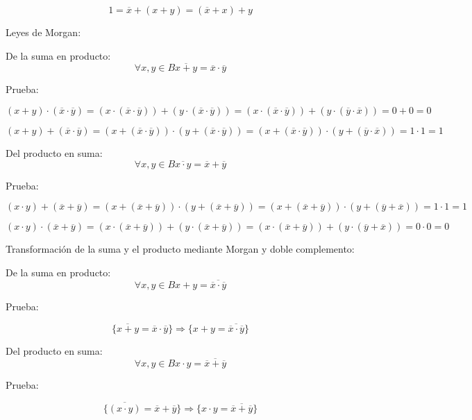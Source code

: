 \[{1 = {\overline{x} + {({x + y})}}} = {{({\overline{x} + x})} + y}\]

Leyes de Morgan:

De la suma en
producto:\[\forall x,{y \in B}{\overline{x+y} = {\overline{x} \cdot \overline{y}}}\]

Prueba:

\[{{{{{({x + y})} \cdot {({\overline{x} \cdot \overline{y}})}} = {{({x \cdot {({\overline{x} \cdot \overline{y}})}})} + {({y \cdot {({\overline{x} \cdot \overline{y}})}})}}} = {{({x \cdot {({\overline{x} \cdot \overline{y}})}})} + {({y \cdot {({\overline{y} \cdot \overline{x}})}})}}} = {0 + 0}} = 0\]

\[{{{{{({x + y})} + {({\overline{x} \cdot \overline{y}})}} = {{({x + {({\overline{x} \cdot \overline{y}})}})} \cdot {({y + {({\overline{x} \cdot \overline{y}})}})}}} = {{({x + {({\overline{x} \cdot \overline{y}})}})} \cdot {({y + {({\overline{y} \cdot \overline{x}})}})}}} = {1 \cdot 1}} = 1\]

Del producto en
suma:\[\forall x,{y \in B}{}{}{}{\overline{x\cdot y} = {\overline{x} + \overline{y}}}\]

Prueba:

\[{{{{{({x \cdot y})} + {({\overline{x} + \overline{y}})}} = {{({x + {({\overline{x} + \overline{y}})}})} \cdot {({y + {({\overline{x} + \overline{y}})}})}}} = {{({x + {({\overline{x} + \overline{y}})}})} \cdot {({y + {({\overline{y} + \overline{x}})}})}}} = {1 \cdot 1}} = 1\]

\[{{{{{({x \cdot y})} \cdot {({\overline{x} + \overline{y}})}} = {{({x \cdot {({\overline{x} + \overline{y}})}})} + {({y \cdot {({\overline{x} + \overline{y}})}})}}} = {{({x \cdot {({\overline{x} + \overline{y}})}})} + {({y \cdot {({\overline{y} + \overline{x}})}})}}} = {0 \cdot 0}} = 0\]

Transformación de la suma y el producto mediante Morgan y doble
complemento:

De la suma en
producto:\[\forall x,{y \in B}{}{}{}{{x + y} = \overline{\overline{x}\cdot\overline{y}}}\]

Prueba:

\[{\{{\overline{x+y} = {\overline{x} \cdot \overline{y}}}\}}\Rightarrow{\{{{x + y} = \overline{\overline{x}\cdot\overline{y}}}\}}\]

Del producto en
suma:\[\forall x,{y \in B}{}{}{}{{x \cdot y} = \overline{\overline{x}+\overline{y}}}\]

Prueba:

\[{\{{\overline{({x\cdot y})} = {\overline{x} + \overline{y}}}\}}\Rightarrow{\{{{x \cdot y} = \overline{\overline{x}+\overline{y}}}\}}\]

